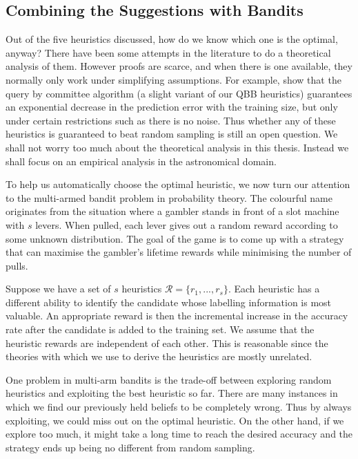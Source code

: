 \documentclass[fleqn,10pt,lineno]{wlpeerj} %
\newcommand{\R}{\mathcal{R}}
\begin{document}
\subsection*{Combining the Suggestions with Bandits}

Out of the five heuristics discussed, how do we know which one is the optimal,
anyway? There have been some attempts in the literature to do a theoretical
analysis of them. However proofs are scarce, and when there is one available,
they normally only work under simplifying assumptions. For example,
\cite{freund97} show that the query by committee algorithm (a slight variant of
our QBB heuristics) guarantees an exponential decrease in the prediction error
with the training size, but only under certain restrictions such as there is no
noise. Thus whether any of these heuristics is guaranteed to beat random
sampling is still an open question. We shall not worry too much about the
theoretical analysis in this thesis. Instead we shall focus on an empirical
analysis in the astronomical domain.

To help us automatically choose the optimal heuristic, we now turn our
attention to the multi-armed bandit problem in probability theory. The
colourful name originates from the situation where a gambler stands in front of
a slot machine with $s$ levers. When pulled, each lever gives out a random
reward according to some unknown distribution. The goal of the game is to come
up with a strategy that can maximise the gambler's lifetime rewards while
minimising the number of pulls.

Suppose we have a set of $s$ heuristics $ \R = \{r_1, ..., r_s \}$. Each
heuristic has a different ability to identify the candidate whose labelling
information is most valuable. An appropriate reward is then the incremental
increase in the accuracy rate after the candidate is added to the training set.
We assume that the heuristic rewards are independent of each other. This is
reasonable since the theories with which we use to derive the heuristics are
mostly unrelated.

One problem in multi-arm bandits is the trade-off between exploring random
heuristics and exploiting the best heuristic so far. There are many instances
in which we find our previously held beliefs to be completely wrong. Thus by
always exploiting, we could miss out on the optimal heuristic. On the other
hand, if we explore too much, it might take a long time to reach the desired
accuracy and the strategy ends up being no different from random sampling.
\end{document}
